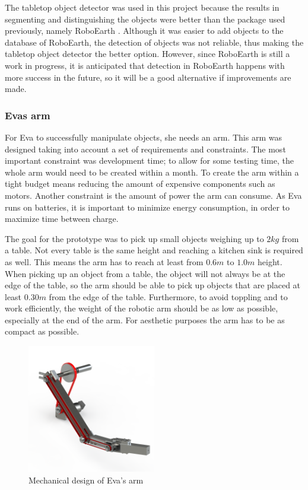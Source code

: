 \documentclass[project_eva.tex]{subfiles}
\begin{document}
The tabletop object detector was used in this project because the results in segmenting and distinguishing the objects 
were better than the package used previously, namely RoboEarth \cite{Roboearth}. Although it was easier to add objects to 
the database of RoboEarth, the detection of objects was not reliable, thus making the tabletop object detector the 
better option. However, since RoboEarth is still a work in progress, it is anticipated that detection in RoboEarth 
happens with more success in the future, so it will be a good alternative if improvements are made.

\subsubsection*{Eva\textquotesingle s arm}
For Eva to successfully manipulate objects, she needs an arm. This arm was designed taking into account a set of 
requirements and constraints. The most important constraint was development time; to allow for some testing time, the 
whole arm would need to be created within a month. To create the arm within a tight budget means reducing the amount of 
expensive components such as motors. Another constraint is the amount of power the arm can consume. As Eva runs on 
batteries, it is important to minimize energy consumption, in order to maximize time between charge.

The goal for the prototype was to pick up small objects weighing up to $2kg$ from a table. Not every table is the same 
height and reaching a kitchen sink is required as well. This means the arm has to reach at least from $0.6m$ to $1.0m$ 
height. When picking up an object from a table, the object will not always be at the edge of the table, so the arm should 
be able to pick up objects that are placed at least $0.30m$ from the edge of the table. Furthermore, to avoid toppling 
and to work efficiently, the weight of the robotic arm should be as low as possible, especially at the end of the arm. 
For aesthetic purposes the arm has to be as compact as possible.

\begin{figure}[h]
	\centering
	\mbox{\includegraphics[width=0.5\textwidth]{Images/armMechOverview.png}}
	\caption{Mechanical design of Eva's arm}
	\label{fig:armMechOverview}
\end{figure}
\end{document}
